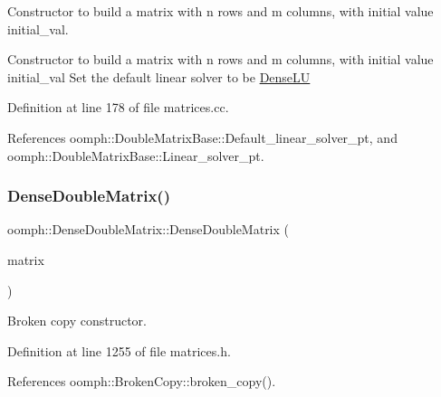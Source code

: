 Constructor to build a matrix with n rows and m columns, with initial value initial\+\_\+val. 

Constructor to build a matrix with n rows and m columns, with initial value initial\+\_\+val Set the default linear solver to be \hyperlink{classoomph_1_1DenseLU}{Dense\+LU} 

Definition at line 178 of file matrices.\+cc.



References oomph\+::\+Double\+Matrix\+Base\+::\+Default\+\_\+linear\+\_\+solver\+\_\+pt, and oomph\+::\+Double\+Matrix\+Base\+::\+Linear\+\_\+solver\+\_\+pt.

\mbox{\label{classoomph_1_1DenseDoubleMatrix_a846bc6a2ec6b84d59591f3e9396b8493}} 
\subsubsection{\texorpdfstring{Dense\+Double\+Matrix()}{DenseDoubleMatrix()}\hspace{0.1cm}{\footnotesize\ttfamily [5/5]}}
{\footnotesize\ttfamily oomph\+::\+Dense\+Double\+Matrix\+::\+Dense\+Double\+Matrix (\begin{DoxyParamCaption}\item[{const \hyperlink{classoomph_1_1DenseDoubleMatrix}{Dense\+Double\+Matrix} \&}]{matrix }\end{DoxyParamCaption})\hspace{0.3cm}{\ttfamily [inline]}}



Broken copy constructor. 



Definition at line 1255 of file matrices.\+h.



References oomph\+::\+Broken\+Copy\+::broken\+\_\+copy().

\mbox{\label{classoomph_1_1DenseDoubleMatrix_a5b68ac6eb31db9b0221d0dd724bcc3a6}} 
